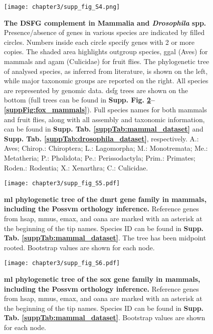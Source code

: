 \documentclass[../main.tex]{subfiles}
\begin{document}
\begin{figure}[ht]
	\centering
	\texttt{[image: chapter3/supp\_fig\_S4.png]}
	\captionsetup{width=\textwidth}
	\caption{
		\textbf{The DSFG complement in Mammalia and \textit{Drosophila} spp.} Presence/absence of genes in various species are indicated by filled circles. Numbers inside each circle specify genes with 2 or more copies. The shaded area highlights outgroup species, \gls{ggal} (Aves) for mammals and \gls{agam} (Culicidae) for fruit flies. The phylogenetic tree of analysed species, as inferred from literature, is shown on the left, while major taxonomic groups are reported on the right. All species are represented by genomic data. \gls{dsfg} trees are shown on the bottom (full trees can be found in \textbf{Supp. Fig. \ref{suppFig:dmrt_mammals}--\ref{suppFig:fox_mammals}}). Full species names for both mammals and fruit flies, along with all assembly and taxonomic information, can be found in \textbf{Supp. Tab. \ref{suppTab:mammal_dataset}} and \textbf{Supp. Tab. \ref{suppTab:drosophila_dataset}}, respectively. A.: Aves; Chirop.: Chiroptera; L.: Lagomorpha; M.: Monotremata; Me.: Metatheria; P.: Pholidota; Pe.: Perissodactyla; Prim.: Primates; Roden.: Rodentia; X.: Xenarthra; C.: Culicidae.
	}
	\label{suppFig:DSFG_testCompilation}
\end{figure}

\begin{figure}[ht]
	\centering
	\texttt{[image: chapter3/supp\_fig\_S5.pdf]}
	\captionsetup{width=\textwidth}
	\caption{
		\textbf{\gls{ml} phylogenetic tree of the \gls{dmrt} gene family in mammals, including the Possvm orthology inference.} Reference genes from \gls{hsap}, \gls{mmus}, \gls{emax}, and \gls{oana} are marked with an asterisk at the beginning of the tip names. Species ID can be found in \textbf{Supp. Tab. \ref{suppTab:mammal_dataset}}. The tree has been midpoint rooted. Bootstrap values are shown for each node.
	}
	\label{suppFig:dmrt_mammals}
\end{figure}

\begin{figure}[ht]
	\centering
	\texttt{[image: chapter3/supp\_fig\_S6.pdf]}
	\captionsetup{width=\textwidth}
	\caption{
		\textbf{\gls{ml} phylogenetic tree of the \gls{sox} gene family in mammals, including the Possvm orthology inference.} Reference genes from \gls{hsap}, \gls{mmus}, \gls{emax}, and \gls{oana} are marked with an asterisk at the beginning of the tip names. Species ID can be found in \textbf{Supp. Tab. \ref{suppTab:mammal_dataset}}. Bootstrap values are shown for each node.
	}
	\label{suppFig:sox_mammals}
\end{figure}
\end{document}
